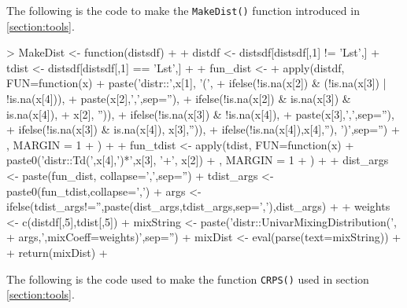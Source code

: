 \documentclass[11pt,notitlepage]{isuthesis}
\begin{document}


The following is the code to make the \texttt{MakeDist()} function introduced 
in \ref{section:tools}.
\begin{Schunk}
\begin{Sinput}
> MakeDist <- function(distsdf){
+   
+   distdf <- distsdf[distsdf[,1] != 'Lst',]
+   tdist <- distsdf[distsdf[,1] == 'Lst',]
+   
+   fun_dist <- 
+     apply(distdf, FUN=function(x) {
+       paste('distr::',x[1], '(', 
+             ifelse(!is.na(x[2]) & (!is.na(x[3]) | !is.na(x[4])),
+                    paste(x[2],',',sep=''),
+                    ifelse(!is.na(x[2]) & is.na(x[3]) & is.na(x[4]),
+                           x[2], '')), 
+             ifelse(!is.na(x[3]) & !is.na(x[4]),
+                    paste(x[3],',',sep=''),
+                    ifelse(!is.na(x[3]) & is.na(x[4]), x[3],'')), 
+             ifelse(!is.na(x[4]),x[4],''), ')',sep='')
+     }, MARGIN = 1
+     )
+   
+   fun_tdist <- apply(tdist, FUN=function(x) {
+     paste0('distr::Td(',x[4],')*',x[3], '+', x[2])
+   }, MARGIN = 1
+   )
+   
+   dist_args <- paste(fun_dist, collapse=',',sep='')
+   tdist_args <- paste0(fun_tdist,collapse=',')
+   args <- ifelse(tdist_args!='',paste(dist_args,tdist_args,sep=','),dist_args)
+   
+   weights <- c(distdf[,5],tdist[,5])
+   mixString <- paste('distr::UnivarMixingDistribution(',
+                      args,',mixCoeff=weights)',sep='')
+   mixDist <- eval(parse(text=mixString))
+   
+   return(mixDist)
+ }
\end{Sinput}
\end{Schunk}


The following is the code used to make the function \texttt{CRPS()} used in
section \ref{section:tools}.
\begin{Schunk}
\end{Schunk}






\clearpage
\pagebreak

%
\end{document}
